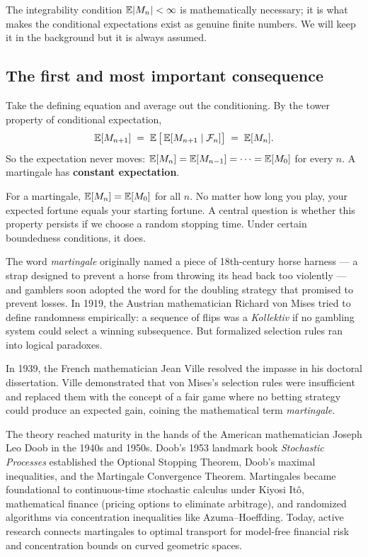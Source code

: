 The integrability condition $\operatorname{\mathbb{E}}\lvert M_n\rvert < \infty$ is mathematically necessary; it is what makes
the conditional expectations exist as genuine finite numbers. We will keep it in the background but it
is always assumed.

\subsection{The first and most important consequence}

Take the defining equation and average out the conditioning. By the tower property of conditional
expectation,
\[
  \operatorname{\mathbb{E}}[M_{n+1}] \;=\; \operatorname{\mathbb{E}}\big[\operatorname{\mathbb{E}}[M_{n+1}\mid\mathcal{F}_n]\big] \;=\; \operatorname{\mathbb{E}}[M_n].
\]
So the expectation never moves: $\operatorname{\mathbb{E}}[M_n] = \operatorname{\mathbb{E}}[M_{n-1}] = \cdots = \operatorname{\mathbb{E}}[M_0]$ for every $n$. A
martingale has \textbf{constant expectation}.

\begin{focusbox}
For a martingale, $\operatorname{\mathbb{E}}[M_n] = \operatorname{\mathbb{E}}[M_0]$ for all $n$. No matter how long you play, your expected fortune equals your starting fortune. A central question is whether this property persists if we choose a random stopping time. Under certain boundedness conditions, it does.
\end{focusbox}

\begin{historybox}
The word \emph{martingale} originally named a piece of 18th-century horse harness --- a strap designed to
prevent a horse from throwing its head back too violently --- and gamblers soon adopted the word for the
doubling strategy that promised to prevent losses. In 1919, the Austrian mathematician
Richard von Mises tried to define randomness empirically: a sequence of flips was a \emph{Kollektiv}
if no gambling system could select a winning subsequence. But formalized selection rules ran into
logical paradoxes.

In 1939, the French mathematician Jean Ville resolved the impasse in his doctoral dissertation. Ville
demonstrated that von Mises's selection rules were insufficient and replaced them with the concept of a
fair game where no betting strategy could produce an expected gain, coining the mathematical term
\emph{martingale}.

The theory reached maturity in the hands of the American mathematician Joseph Leo Doob in the 1940s
and 1950s. Doob's 1953 landmark book \emph{Stochastic Processes} established the Optional Stopping
Theorem, Doob's maximal inequalities, and the Martingale Convergence Theorem. Martingales became
foundational to continuous-time stochastic calculus under Kiyosi It\^o, mathematical finance (pricing
options to eliminate arbitrage), and randomized algorithms via concentration inequalities like
Azuma--Hoeffding. Today, active research connects martingales to optimal transport for model-free
financial risk and concentration bounds on curved geometric spaces.
\end{historybox}

